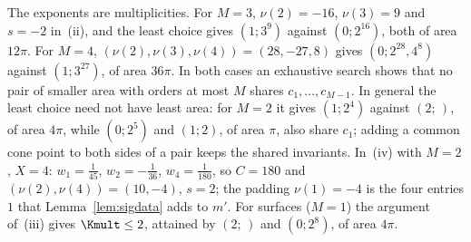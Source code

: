 The exponents are multiplicities. For $M=3$, $\nu(2)=-16$, $\nu(3)=9$ and $s=-2$ in~(ii), and the least choice gives $(1;3^9)$ against $(0;2^{16})$, both of area $12\pi$. For $M=4$, $(\nu(2),\nu(3),\nu(4))=(28,-27,8)$ gives $(0;2^{28},4^8)$ against $(1;3^{27})$, of area $36\pi$. In both cases an exhaustive search shows that no pair of smaller area with orders at most $M$ shares $c_1,\dots,c_{M-1}$. In general the least choice need not have least area: for $M=2$ it gives $(1;2^4)$ against $(2;\,)$, of area $4\pi$, while $(0;2^5)$ and $(1;2)$, of area $\pi$, also share $c_1$; adding a common cone point to both sides of a pair keeps the shared invariants. In~(iv) with $M=2$, $X=4$: $w_1=\frac1{45}$, $w_2=-\frac1{36}$, $w_4=\frac1{180}$, so $C=180$ and $(\nu(2),\nu(4))=(10,-4)$, $s=2$; the padding $\nu(1)=-4$ is the four entries $1$ that Lemma~\ref{lem:sigdata} adds to $m'$. For surfaces ($M=1$) the argument of~(iii) gives $\Kmult\le2$, attained by $(2;\,)$ and $(0;2^8)$, of area $4\pi$.

